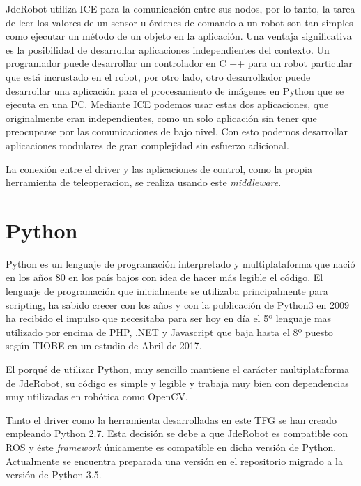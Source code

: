 JdeRobot utiliza ICE para la comunicación entre sus nodos, por lo tanto, la tarea de leer
los valores de un sensor u órdenes de comando a un robot son tan simples como ejecutar un método de un objeto en la aplicación. Una ventaja significativa es la posibilidad de desarrollar aplicaciones independientes del contexto. Un programador puede desarrollar un controlador en C ++ para un robot particular que está incrustado en el robot, por otro lado, otro desarrollador puede desarrollar una aplicación para el procesamiento de imágenes en Python que se ejecuta en una PC. Mediante ICE podemos usar estas dos aplicaciones, que originalmente eran independientes, como un solo aplicación sin tener que preocuparse por las comunicaciones de bajo nivel. Con esto podemos desarrollar aplicaciones modulares de gran complejidad sin esfuerzo adicional.

La conexión entre el driver y las aplicaciones de control, como la propia herramienta de teleoperacion, se realiza usando este \textit{middleware}.

\section{Python}
\label{sec:python}

Python es un lenguaje de programaci\'on interpretado y multiplataforma que naci\'o en los años 80 en los país bajos con idea de hacer más legible el c\'odigo.
El lenguaje de programaci\'on que inicialmente se utilizaba principalmente para scripting, ha sabido crecer con los años y con la publicaci\'on de Python3 en 2009 ha recibido el impulso que necesitaba para ser hoy en día el 5º lenguaje mas utilizado por encima de PHP, .NET y Javascript que baja hasta el 8º puesto según TIOBE en un estudio de Abril de 2017.

El porqué de utilizar Python, muy sencillo mantiene el carácter multiplataforma de JdeRobot, su c\'odigo es simple y legible y trabaja muy bien con dependencias muy utilizadas en rob\'otica como OpenCV.

Tanto el driver como la herramienta desarrolladas en este TFG se han creado empleando Python 2.7. Esta decisión se debe a que JdeRobot es compatible con ROS y éste \textit{framework} únicamente es compatible en dicha versión de Python. Actualmente se encuentra preparada una versión en el repositorio migrado a la versión de Python 3.5.

\cleardoublepage